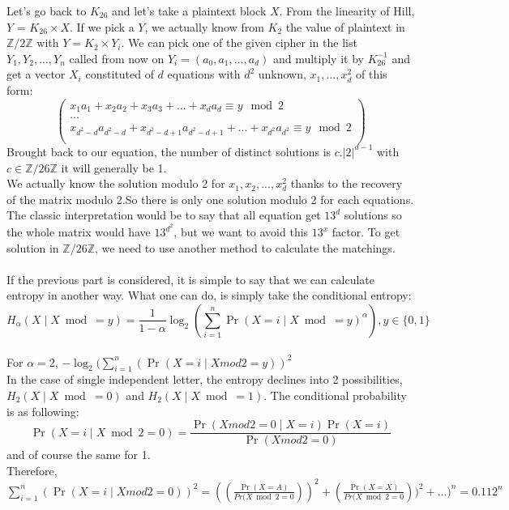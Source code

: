 \documentclass{article}
\begin{document}
Let's go back to $K_{26}$ and let's take a plaintext block $X$. From the linearity of Hill, $Y$ = $K_{26} \times X$. If we pick a $Y$, we actually know from $K_{2}$ the value of plaintext in $\mathbb{Z}/2\mathbb{Z}$ with $Y = K_2 \times Y_i$. We can pick one of the given cipher in the list $ Y_1 , Y_2 , ... , Y_n$ called from now on $Y_i= (a_0,a_1,...,a_d)$  and multiply it by $K_{26}^{-1}$ and get a vector $X_i$ constituted of $d$ equations with $d^2$ unknown, $x_1, ...,x_d^{2}$ of this form:\\
$$
\begin{pmatrix}
x_1 a_1 + x_2 a_2 + x_3 a_3 + ... + x_{d} a_{d} \equiv y \mod 2 \\
...\\
x_{d^2 - d} a_{d^2 - d} + x_{d^2 - d +1}  a_{d^2 - d+1}  + ... + x_{d^2} a_{d^2} \equiv y \mod 2\\
\end{pmatrix}
$$
Brought back to our equation, the number of distinct solutions is $c.|2|^{d-1}$ with $c \in  \mathbb{Z}/26\mathbb{Z}$ it will generally be 1.\\
We actually know the solution modulo 2 for $x_1 ,x_2 ,... , x_d^{2}$ thanks to the recovery of the matrix modulo 2.So there is only one solution modulo 2 for each equations. The classic interpretation would be to say that all equation get $13^d$ solutions so the whole matrix would have $13^{d^2}$, but we want to avoid this $13^x$ factor. To get solution in $\mathbb{Z}/26\mathbb{Z}$, we need to use another method to calculate the matchings.\\
\\
If the previous part is considered, it is simple to say that we can calculate entropy in another way. What one can do, is simply take the conditional entropy:$$H_{\alpha}(X \mid X \bmod = y) = \frac{1}{1-\alpha}\log_{2}(\sum_{i=1}^{n}{\Pr(X=i \mid X \bmod = y )^{\alpha}}) , y \in \{0,1\} $$\\
For $\alpha = 2$, $-\log_{2}(\sum_{i=1}^{n}{(\Pr (X=i \mid X mod2 = y))^{2}}$\\
In the case of single independent letter, the entropy declines into 2 possibilities, $H_{2}(X \mid X \bmod = 0) $ and $H_{2}(X \mid X \bmod = 1)$. The conditional probability is as following:
$$\Pr (X=i \mid X \bmod 2 = 0 ) = \frac{\Pr(X mod 2 = 0 \mid X = i) \Pr(X=i)}{\Pr(X mod 2 =0)} $$ and of course the same for 1.\\
Therefore, $\sum_{i=1}^{n}{(\Pr (X=i \mid X mod2 = 0))^{2}} = ((\frac{\Pr(X=A)}{Pr(X \bmod 2 = 0}))^{2} + (\frac{\Pr(X=X)}{Pr(X \bmod 2 = 0}))^{2} + ... )^{n}= 0.112^{n}$\\
\end{document}

